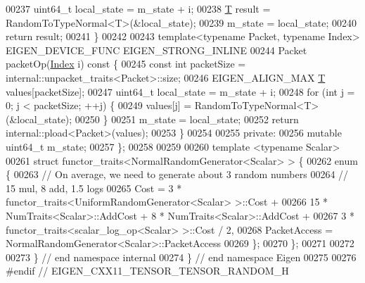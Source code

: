 \begin{DoxyCode}
00237     uint64\_t local\_state = m\_state + i;
00238     \hyperlink{group___sparse_core___module_class_eigen_1_1_triplet}{T} result = RandomToTypeNormal<T>(&local\_state);
00239     m\_state = local\_state;
00240     \textcolor{keywordflow}{return} result;
00241   \}
00242 
00243   \textcolor{keyword}{template}<\textcolor{keyword}{typename} Packet, \textcolor{keyword}{typename} Index> EIGEN\_DEVICE\_FUNC EIGEN\_STRONG\_INLINE
00244   Packet packetOp(\hyperlink{namespace_eigen_a62e77e0933482dafde8fe197d9a2cfde}{Index} i)\textcolor{keyword}{ const }\{
00245     \textcolor{keyword}{const} \textcolor{keywordtype}{int} packetSize = internal::unpacket\_traits<Packet>::size;
00246     EIGEN\_ALIGN\_MAX \hyperlink{group___sparse_core___module_class_eigen_1_1_triplet}{T} values[packetSize];
00247     uint64\_t local\_state = m\_state + i;
00248     \textcolor{keywordflow}{for} (\textcolor{keywordtype}{int} j = 0; j < packetSize; ++j) \{
00249       values[j] = RandomToTypeNormal<T>(&local\_state);
00250     \}
00251     m\_state = local\_state;
00252     \textcolor{keywordflow}{return} internal::pload<Packet>(values);
00253   \}
00254 
00255  \textcolor{keyword}{private}:
00256   \textcolor{keyword}{mutable} uint64\_t m\_state;
00257 \};
00258 
00259 
00260 \textcolor{keyword}{template} <\textcolor{keyword}{typename} Scalar>
00261 \textcolor{keyword}{struct }functor\_traits<NormalRandomGenerator<Scalar> > \{
00262   \textcolor{keyword}{enum} \{
00263     \textcolor{comment}{// On average, we need to generate about 3 random numbers}
00264     \textcolor{comment}{// 15 mul, 8 add, 1.5 logs}
00265     Cost = 3 * functor\_traits<UniformRandomGenerator<Scalar> >::Cost +
00266            15 * NumTraits<Scalar>::AddCost + 8 * NumTraits<Scalar>::AddCost +
00267            3 * functor\_traits<scalar\_log\_op<Scalar> >::Cost / 2,
00268     PacketAccess = NormalRandomGenerator<Scalar>::PacketAccess
00269   \};
00270 \};
00271 
00272 
00273 \} \textcolor{comment}{// end namespace internal}
00274 \} \textcolor{comment}{// end namespace Eigen}
00275 
00276 \textcolor{preprocessor}{#endif // EIGEN\_CXX11\_TENSOR\_TENSOR\_RANDOM\_H}
\end{DoxyCode}
